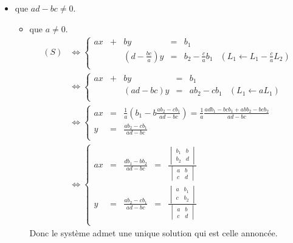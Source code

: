 \documentclass{article}
\begin{document}
\begin{question_kholle}
		\begin{itemize}[label=$\bullet$ Supposons]
			\item que $ad - bc \neq 0$.
			\begin{itemize}[label=$\bullet$ Supposons]
				\item que $a \neq 0$.
				\begin{equation*}
					\begin{aligned}
						(S)
						&\iff \left\{
							\begin{array}{cccccc}
								ax &+& by &=& b_1 \\
								&&\left(d - \frac{bc}{a}\right)y &=& b_2 - \frac{c}{a} b_1 &(L_1 \leftarrow L_1 - \frac{c}{a} L_2) \\
							\end{array}
						\right. \\
						&\iff \left\{
						\begin{array}{cccccc}
							ax &+& by &=& b_1 \\
							&&\left(ad - bc\right)y &=& a b_2 - c b_1 &(L_1 \leftarrow aL_1) \\
						\end{array}
						\right. \\
						&\iff \left\{
						\begin{array}{ccc}
							ax &=& \frac{1}{a} \left(b_1 - b\frac{ab_2 - cb_1}{ad - bc}\right) = \frac{1}{a} \frac{adb_1 - bcb_1 + abb_2 - bcb_2}{ad - bc} \\
							y &=& \frac{ab_2 - cb_1}{ad - bc} \\
						\end{array}
						\right. \\
						&\iff \left\{
						\begin{array}{ccccc}
							ax &=& \frac{db_1 - bb_2}{ad - bc} &=& \frac{\begin{vmatrix}b_1&b\\b_2&d\end{vmatrix}}{\begin{vmatrix}a&b\\c&d\end{vmatrix}} \\
							y &=& \frac{ab_2 - cb_1}{ad - bc} &=& \frac{\begin{vmatrix}a&b_1\\c&b_2\end{vmatrix}}{\begin{vmatrix}a&b\\c&d\end{vmatrix}}\\
						\end{array}
						\right.
					\end{aligned}
				\end{equation*}
				Donc le système admet une unique solution qui est celle annoncée.
				

\end{itemize}
\end{itemize}
\end{question_kholle}
\end{document}
